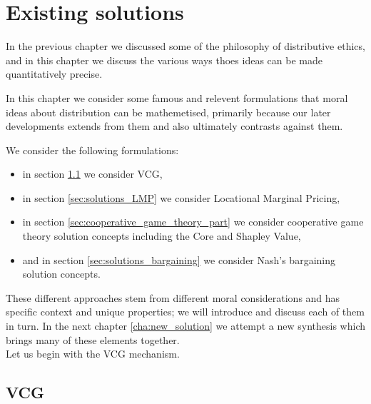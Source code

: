 \chapter{Existing solutions}
\label{cha:solutions}

In the previous chapter we discussed some of the philosophy of distributive ethics, and in this chapter we discuss the various ways thoes ideas can be made quantitatively precise.

In this chapter we consider some famous and relevent formulations that moral ideas about distribution can be mathemetised, primarily because our later developments extends from them and also ultimately contrasts against them.

We consider the following formulations:
\begin{itemize}
\item in section \ref{sec:solutions_VCG} we consider VCG,
\item in section \ref{sec:solutions_LMP} we consider Locational Marginal Pricing,
\item in section \ref{sec:cooperative_game_theory_part} we consider cooperative game theory solution concepts including the Core and Shapley Value,
\item and in section \ref{sec:solutions_bargaining} we consider Nash's bargaining solution concepts.
\end{itemize}


These different approaches stem from different moral considerations and has specific context and unique properties; we will introduce and discuss each of them in turn.
In the next chapter \ref{cha:new_solution} we attempt a new synthesis which brings many of these elements together.\\
Let us begin with the VCG mechanism.

\section{VCG}\label{sec:solutions_VCG}

